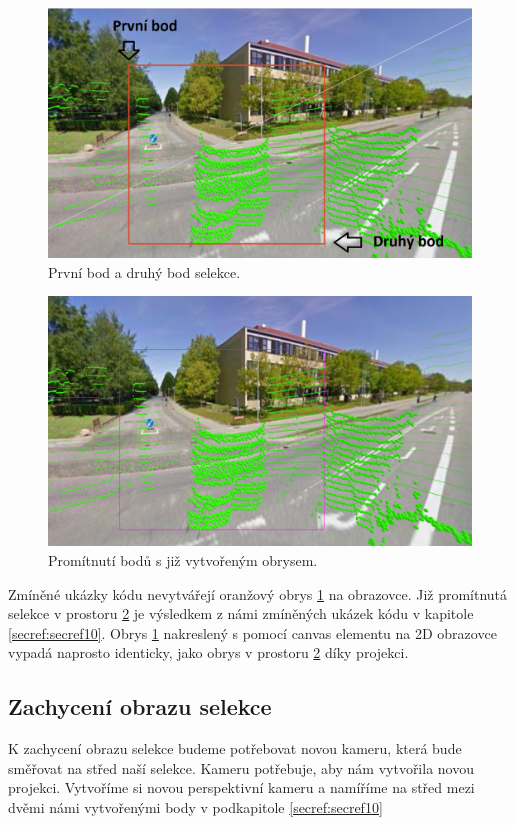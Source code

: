 \documentclass[czech,bachelor,dept420,male,cpdeclaration]{diploma}
\begin{document}
\begin{figure}[H]
\centering
\includegraphics[width=\linewidth]{Figures/selectionBeforeProjection.png}
\caption{První bod a druhý bod selekce. }
\label{fig:selectionBefore}
\end{figure} 

\begin{figure}[H]
\centering
\includegraphics[width=\linewidth]{Figures/selectionAfterProjection.png}
\caption{Promítnutí bodů s již vytvořeným obrysem. }
\label{fig:selectionAfter}
\end{figure}

Zmíněné ukázky kódu nevytvářejí oranžový obrys \ref{fig:selectionBefore} na obrazovce. Již promítnutá selekce v prostoru \ref{fig:selectionAfter} je výsledkem z námi zmíněných ukázek kódu v kapitole \ref{secref:secref10}. Obrys \ref{fig:selectionBefore} nakreslený s pomocí canvas elementu na 2D obrazovce vypadá naprosto identicky, jako obrys v prostoru \ref{fig:selectionAfter} díky projekci.

\subsection{Zachycení obrazu selekce}\label{secref:secref13} 
K zachycení obrazu selekce budeme potřebovat novou kameru, která bude směřovat na střed naší selekce. Kameru potřebuje, aby nám vytvořila novou projekci. Vytvoříme si novou perspektivní kameru a namíříme na střed mezi dvěmi námi vytvořenými body v podkapitole \ref{secref:secref10}
\end{document}
